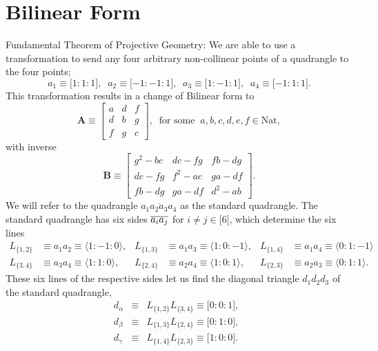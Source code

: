 \documentclass[11pt]{article}
\begin{document}
\author{Sebastian Blefari}
\date{}

\section{Bilinear Form}

Fundamental Theorem of Projective Geometry:\newline
We are able to use a transformation to send any four arbitrary non-collinear
points of a quadrangle to the four points; 
\begin{equation*}
a_{1}\equiv \lbrack 1:1:1],\;\;a_{2}\equiv \lbrack -1:-1:1],\;\;a_{3}\equiv
\lbrack 1:-1:1],\;\;a_{4}\equiv \lbrack -1:1:1].
\end{equation*}%
This transformation results in a change of Bilinear form to 
\begin{equation*}
\mathbf{A}\equiv 
\begin{bmatrix}
a & d & f \\ 
d & b & g \\ 
f & g & c%
\end{bmatrix}%
,\;\;\text{for some}\;\;a,b,c,d,e,f\in \text{Nat},
\end{equation*}%
with inverse 
\begin{equation*}
\mathbf{B}\equiv 
\begin{bmatrix}
g^{2}-bc & dc-fg & fb-dg \\ 
dc-fg & f^{2}-ac & ga-df \\ 
fb-dg & ga-df & d^{2}-ab%
\end{bmatrix}%
.
\end{equation*}%
We will refer to the quadrangle $\overline{a_{1}a_{2}a_{3}a_{4}}$ as the
standard quadrangle. The standard quadrangle has six sides $\overline{%
a_{i}a_{j}}$ for $i\neq j\in \lbrack 6]$, which determine the six lines 
\begin{align*}
L_{\{1,2\}}& \equiv a_{1}a_{2}\equiv \langle 1:-1:0\rangle , & L_{\{1,3\}}&
\equiv a_{1}a_{3}\equiv \langle 1:0:-1\rangle , & L_{\{1,4\}}& \equiv
a_{1}a_{4}\equiv \langle 0:1:-1\rangle \\
L_{\{3,4\}}& \equiv a_{3}a_{4}\equiv \langle 1:1:0\rangle , & L_{\{2,4\}}&
\equiv a_{2}a_{4}\equiv \langle 1:0:1\rangle , & L_{\{2,3\}}& \equiv
a_{2}a_{3}\equiv \langle 0:1:1\rangle .
\end{align*}%
These six lines of the respective sides let us find the diagonal triangle $%
\overline{d_{1}d_{2}d_{3}}$ of the standard quadrangle, 
\begin{eqnarray*}
d_{\alpha } &\equiv &L_{\{1,2\}}L_{\{3,4\}}\equiv \lbrack 0:0:1],\;\; \\
d_{\beta } &\equiv &L_{\{1,3\}}L_{\{2,4\}}\equiv \lbrack 0:1:0],\;\; \\
d_{\gamma } &\equiv &L_{\{1,4\}}L_{\{2,3\}}\equiv \lbrack 1:0:0].
\end{eqnarray*}%
\end{document}

